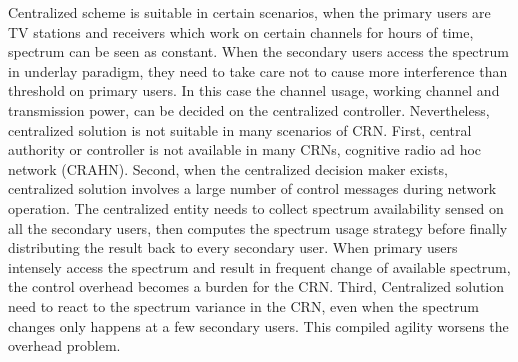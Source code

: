 Centralized scheme is suitable in certain scenarios, \eg when the primary users are TV stations and receivers which work on certain channels for hours of time, spectrum can be seen as constant. 
When the secondary users access the spectrum in underlay paradigm, they need to take care not to cause more interference than threshold on primary users.
In this case the channel usage, \ie working channel and transmission power, can be decided on the centralized controller.
%
Nevertheless, centralized solution is not suitable in many scenarios of CRN.
First, central authority or controller is not available in many CRNs, \eg cognitive radio ad hoc network (\gls{CRAHN}).
Second, when the centralized decision maker exists, centralized solution involves a large number of control messages during network operation.
The centralized entity needs to collect spectrum availability sensed on all the secondary users, then computes the spectrum usage strategy before finally distributing the result back to every secondary user.
When primary users intensely access the spectrum and result in frequent change of available spectrum, the control overhead becomes a burden for the CRN.
Third, Centralized solution need to react to the spectrum variance in the CRN, even when the spectrum changes only happens at a few secondary users.
This compiled agility worsens the overhead problem.






